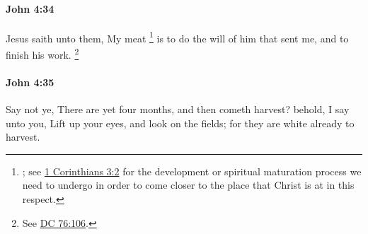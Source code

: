 		\paragraph{John 4:34} %
			\label{JOHN-4-34}

			Jesus saith unto them, My meat%
				\footnote{%
					; see \hyperref[1CORINTHIANS-3-2]{1 Corinthians 3:2} for the development or spiritual maturation process we need to undergo in order to come closer to the place that Christ is at in this respect.
					}
			is to do the will of him that sent me, and to finish his work.%
				\footnote{%
					See \hyperref[DC76-106]{DC 76:106}.
					}

			\begin{framed}
			\scriptsize
				\begin{compactdesc}
					\item[SBLG]  \hyperref[TELEIOO]{} 
				\end{compactdesc}
			\end{framed}

		\paragraph{John 4:35} %
			\label{JOHN-4-35}

			Say not ye, There are yet four months, and then cometh harvest? behold, I say unto you, Lift up your eyes, and look on the fields; for they are white already to harvest.

